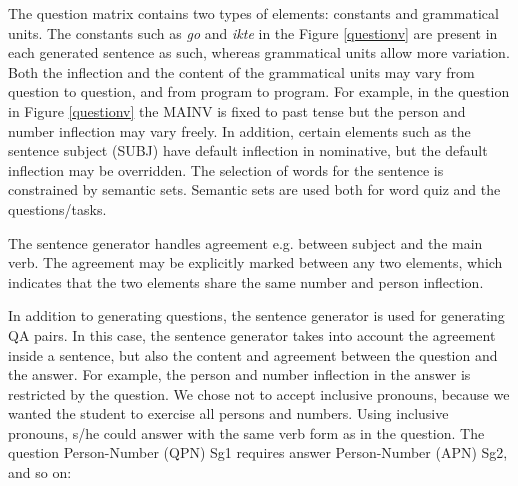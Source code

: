 \documentclass[11pt]{article}
\begin{document}
The question matrix contains two types of elements: constants and grammatical units. The constants such as \textit{go} and \textit{ikte} in the Figure \ref{questionv} are present in each generated sentence as such, whereas grammatical units allow more variation. Both the inflection and the content of the grammatical units may vary from question to question, and from program to program. For example, in the question in Figure \ref{questionv} the MAINV is fixed to past tense but the person and number inflection may vary freely. In addition, certain elements such as the sentence subject (SUBJ) have default inflection in nominative, but the default inflection may be overridden. The selection of words for the sentence is constrained by semantic sets. Semantic sets are used both for word quiz and the questions/tasks. 
%


The sentence generator handles agreement e.g. between subject and the main verb. The agreement may be explicitly marked between any two elements, which indicates that the two elements share the same number and person inflection.

In addition to generating questions, the sentence generator is used for generating QA pairs. In this case, the sentence generator takes into account the agreement inside a sentence, but also the content and agreement between the question and the answer. For example, the person and number inflection in the answer is restricted by the question. We chose not to accept inclusive pronouns, because we wanted the student to exercise all persons and numbers. Using inclusive pronouns, s/he could answer with the same verb form as in the question. The question Person-Number (QPN) Sg1 requires answer Person-Number (APN) Sg2, and so on:\\
\end{document}
